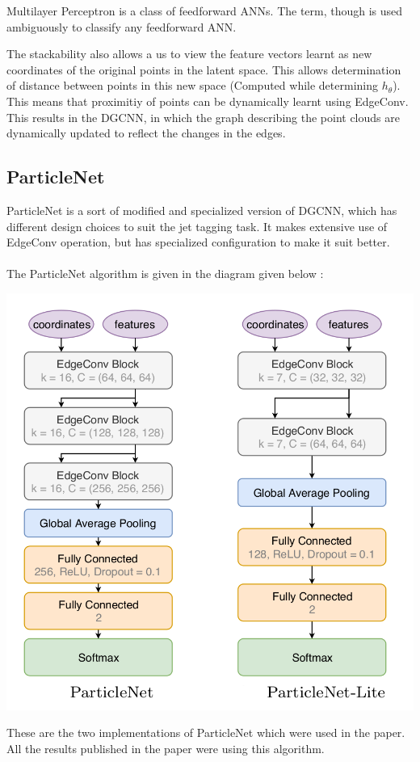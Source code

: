 \begin{note}
    Multilayer Perceptron is a class of feedforward ANNs. The term, though is 
    used ambiguously to classify any feedforward ANN.
\end{note}

\noindent The stackability also allows a us to view the feature vectors 
learnt as new coordinates of the original points in the latent space. This allows 
determination of distance between points in this new space (Computed while 
determining $h_\theta$). This means that proximitiy of points can be dynamically 
learnt using EdgeConv. This results in the DGCNN, in which the graph describing 
the point clouds are dynamically updated to reflect the changes in the edges.

\subsection{ParticleNet}
ParticleNet is a sort of modified and specialized version of DGCNN, which has 
different design choices to suit the jet tagging task. It makes extensive 
use of EdgeConv operation, but has specialized configuration to make it 
suit better.
\\\\
The ParticleNet algorithm is given in the diagram given below :

\begin{center}
    \includegraphics[scale=0.25]{img/theory-ml-particlenet/particle-net.png}
\end{center}

\noindent These are the two implementations of ParticleNet which were used 
in the paper. All the results published in the paper were using this algorithm.
